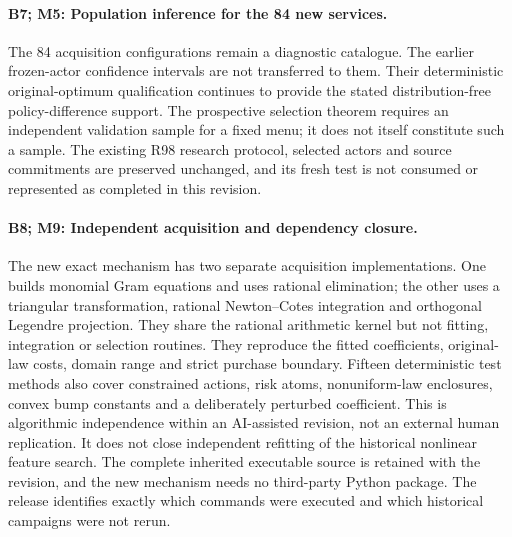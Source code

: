 \documentclass[ecta,nameyear,draft]{econsocart}
\begin{document}
\paragraph{B7; M5: Population inference for the 84 new services.}
The 84 acquisition configurations remain a diagnostic catalogue. The earlier frozen-actor confidence intervals are not transferred to them. Their deterministic original-optimum qualification continues to provide the stated distribution-free policy-difference support. The prospective selection theorem requires an independent validation sample for a fixed menu; it does not itself constitute such a sample. The existing R98 research protocol, selected actors and source commitments are preserved unchanged, and its fresh test is not consumed or represented as completed in this revision.

\paragraph{B8; M9: Independent acquisition and dependency closure.}
The new exact mechanism has two separate acquisition implementations. One builds monomial Gram equations and uses rational elimination; the other uses a triangular transformation, rational Newton--Cotes integration and orthogonal Legendre projection. They share the rational arithmetic kernel but not fitting, integration or selection routines. They reproduce the fitted coefficients, original-law costs, domain range and strict purchase boundary. Fifteen deterministic test methods also cover constrained actions, risk atoms, nonuniform-law enclosures, convex bump constants and a deliberately perturbed coefficient. This is algorithmic independence within an AI-assisted revision, not an external human replication. It does not close independent refitting of the historical nonlinear feature search. The complete inherited executable source is retained with the revision, and the new mechanism needs no third-party Python package. The release identifies exactly which commands were executed and which historical campaigns were not rerun.
\end{document}
